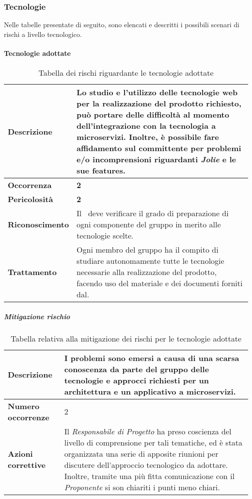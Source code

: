 \subsubsection{Tecnologie}

Nelle tabelle presentate di seguito, sono elencati e descritti i possibili scenari di rischi a livello tecnologico.

\paragraph{Tecnologie adottate}

\begin{table}[H]
	\begin{center}
		\begin{tabular}{|l | p{11cm}|}
			\hline
			\textbf{Descrizione}	& Lo studio e l'utilizzo delle tecnologie web per la realizzazione del prodotto richiesto, può portare delle difficoltà al momento dell'integrazione con la tecnologia a microservizi. Inoltre, è possibile fare affidamento sul committente per problemi e/o incomprensioni riguardanti \textit{Jolie\ped{G}} e le sue features. \\
			\hline
			\textbf{Occorrenza}	&	\textbf{2}	\\
			\hline
			\textbf{Pericolosità}	&	\textbf{2}	\\
			\hline
			\textbf{Riconoscimento}	&	Il \textit{\RdP}\ deve verificare il grado di preparazione di ogni componente del gruppo in merito alle tecnologie scelte.	\\
			\hline
			\textbf{Trattamento}	&	Ogni membro del gruppo ha il compito di studiare autonomamente tutte le tecnologie necessarie alla realizzazione del prodotto, facendo uso del materiale e dei documenti forniti dal\textit{\RdP}.	\\
			\hline
		\end{tabular}
	\caption{Tabella dei rischi riguardante le tecnologie adottate}
	\end{center}
\end{table}
\subparagraph{Mitigazione rischio}

\begin{table}[H]
	\begin{center}
		\begin{tabular}{|l | p{11cm}|}
			\hline
			\textbf{Descrizione}	& I problemi sono emersi a causa di una scarsa conoscenza da parte del gruppo delle tecnologie e approcci richiesti per un architettura e un applicativo a microservizi. \\
			\hline
			\textbf{Numero occorrenze} & 2 \\
			\hline
			\textbf{Azioni correttive}	&	Il \textit{Responsabile di Progetto} ha preso coscienza del livello di comprensione per tali tematiche, ed è stata organizzata una serie di apposite riunioni per discutere dell'approccio tecnologico da adottare. Inoltre, tramite una più fitta comunicazione con il
			\textit{Proponente} si son chiariti i punti meno chiari.	\\
			\hline
		\end{tabular}
		\caption{Tabella relativa alla mitigazione dei rischi per le tecnologie adottate}
	\end{center}
\end{table}


